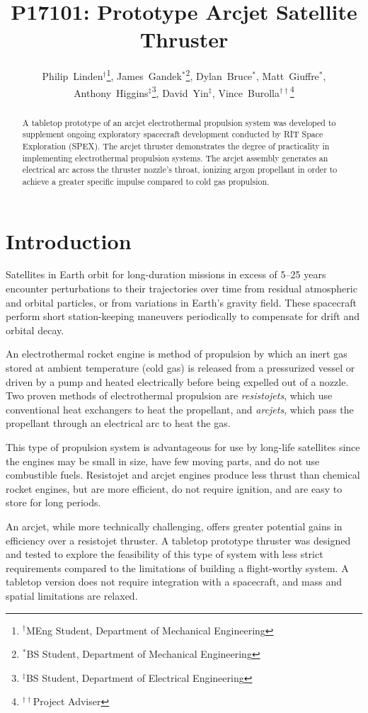 \documentclass[journal]{IEEEtran}
\title{P17101: Prototype Arcjet Satellite Thruster}
\author{
  Philip~Linden$^{\dagger}$\thanks{$^{\dagger}$MEng Student, Department of Mechanical Engineering},
  James~Gandek$^{*}$\thanks{$^{*}$BS Student, Department of Mechanical Engineering},
  Dylan~Bruce$^{*}$,
  Matt~Giuffre$^{*}$,
  Anthony~Higgins$^{\ddagger}$\thanks{$^{\ddagger}$BS Student, Department of Electrical Engineering},
  David~Yin$^{\ddagger}$,
  Vince~Burolla$^{\dagger\dagger}$\thanks{$^{\dagger\dagger}$Project Adviser}
}
\begin{document}
\maketitle


\begin{abstract}
A tabletop prototype of an arcjet electrothermal propulsion system was developed to supplement ongoing exploratory spacecraft development conducted by RIT Space Exploration (SPEX). The arcjet thruster demonstrates the degree of practicality in implementing electrothermal propulsion systems. The arcjet assembly generates an electrical arc across the thruster nozzle's throat, ionizing argon propellant in order to achieve a greater specific impulse compared to cold gas propulsion.
\end{abstract}
\section{Introduction}
Satellites in Earth orbit for long-duration missions in excess of 5--25 years encounter perturbations to their trajectories over time from residual atmospheric and orbital particles, or from variations in Earth's gravity field.
These spacecraft perform short station-keeping maneuvers periodically to compensate for drift and orbital decay.

An electrothermal rocket engine is method of propulsion by which an inert gas stored at ambient temperature (cold gas) is released from a pressurized vessel or driven by a pump and heated electrically before being expelled out of a nozzle.
Two proven methods of electrothermal propulsion are \emph{resistojets}, which use conventional heat exchangers to heat the propellant, and \emph{arcjets}, which pass the propellant through an electrical arc to heat the gas.

This type of propulsion system is advantageous for use by long-life satellites since the engines may be small in size, have few moving parts, and do not use combustible fuels.
Resistojet and arcjet engines produce less thrust than chemical rocket engines, but are more efficient, do not require ignition, and are easy to store for long periods.

An arcjet, while more technically challenging, offers greater potential gains in efficiency over a resistojet thruster.
A tabletop prototype thruster was designed and tested to explore the feasibility of this type of system with less strict requirements compared to the limitations of building a flight-worthy system.
A tabletop version does not require integration with a spacecraft, and mass and spatial limitations are relaxed.
\end{document}
